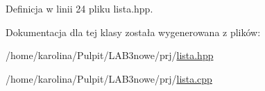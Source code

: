 Definicja w linii 24 pliku lista.\-hpp.



Dokumentacja dla tej klasy została wygenerowana z plików\-:\begin{DoxyCompactItemize}
\item 
/home/karolina/\-Pulpit/\-L\-A\-B3nowe/prj/\hyperlink{lista_8hpp}{lista.\-hpp}\item 
/home/karolina/\-Pulpit/\-L\-A\-B3nowe/prj/\hyperlink{lista_8cpp}{lista.\-cpp}\end{DoxyCompactItemize}
